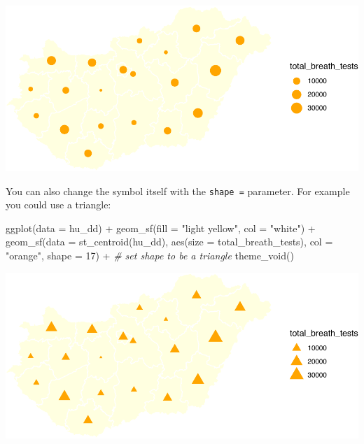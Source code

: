 \documentclass[
  krantz2]{krantz}
\makeatletter
\newenvironment{Shaded}{\begin{snugshade}}{\end{snugshade}}
\newcommand{\AttributeTok}[1]{\textcolor[rgb]{0.61,0.61,0.61}{#1}}
\newcommand{\CommentTok}[1]{\textcolor[rgb]{0.37,0.37,0.37}{\textit{#1}}}
\newcommand{\DecValTok}[1]{\textcolor[rgb]{0.06,0.06,0.06}{#1}}
\newcommand{\FunctionTok}[1]{\textcolor[rgb]{0,0,0}{#1}}
\newcommand{\NormalTok}[1]{#1}
\newcommand{\SpecialCharTok}[1]{\textcolor[rgb]{0,0,0}{#1}}
\newcommand{\StringTok}[1]{\textcolor[rgb]{0.5,0.5,0.5}{#1}}
\newenvironment{kframe}{%
\medskip{}
\setlength{\fboxsep}{.8em}
 \def\at@end@of@kframe{}%
 \ifinner\ifhmode%
  \def\at@end@of@kframe{\end{minipage}}%
  \begin{minipage}{\columnwidth}%
 \fi\fi%
 \def\FrameCommand##1{\hskip\@totalleftmargin \hskip-\fboxsep
 \colorbox{shadecolor}{##1}\hskip-\fboxsep
     \hskip-\linewidth \hskip-\@totalleftmargin \hskip\columnwidth}%
 \MakeFramed {\advance\hsize-\width
   \@totalleftmargin\z@ \linewidth\hsize
   \@setminipage}}%
 {\par\unskip\endMakeFramed%
 \at@end@of@kframe}
\renewenvironment{Shaded}{\begin{kframe}}{\end{kframe}}
\makeatother
\begin{document}
\includegraphics{crime_mapping_files/figure-latex/gradsymbmapcol-1.pdf}

You can also change the symbol itself with the \texttt{shape\ =} parameter. For example you could use a triangle:

\begin{Shaded}
\begin{Highlighting}[]
\FunctionTok{ggplot}\NormalTok{(}\AttributeTok{data =}\NormalTok{ hu\_dd) }\SpecialCharTok{+} 
  \FunctionTok{geom\_sf}\NormalTok{(}\AttributeTok{fill =} \StringTok{"light yellow"}\NormalTok{, }
          \AttributeTok{col =} \StringTok{"white"}\NormalTok{) }\SpecialCharTok{+} 
  \FunctionTok{geom\_sf}\NormalTok{(}\AttributeTok{data =} \FunctionTok{st\_centroid}\NormalTok{(hu\_dd), }
          \FunctionTok{aes}\NormalTok{(}\AttributeTok{size =}\NormalTok{ total\_breath\_tests), }
          \AttributeTok{col =} \StringTok{"orange"}\NormalTok{, }
          \AttributeTok{shape =} \DecValTok{17}\NormalTok{) }\SpecialCharTok{+} \CommentTok{\# set shape to be a triangle}
  \FunctionTok{theme\_void}\NormalTok{()}
\end{Highlighting}
\end{Shaded}

\includegraphics{crime_mapping_files/figure-latex/gradsymbmapcoltriangle-1.pdf}
\end{document}
